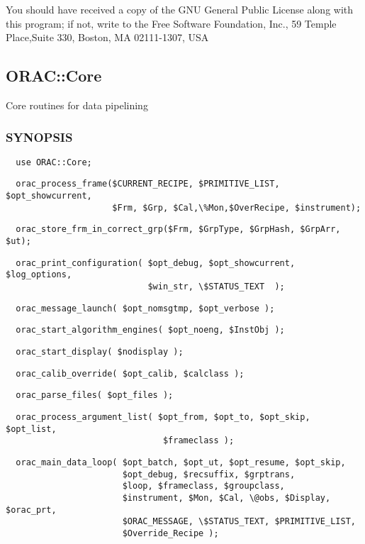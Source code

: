 You should have received a copy of the GNU General Public License along with
this program; if not, write to the Free Software Foundation, Inc., 59 Temple
Place,Suite 330, Boston, MA  02111-1307, USA

\subsection{ORAC::Core\label{ORAC::Core}}


Core routines for data pipelining

\subsubsection*{SYNOPSIS\label{ORAC::Core_SYNOPSIS}}
\begin{verbatim}
  use ORAC::Core;
\end{verbatim}
\begin{verbatim}
  orac_process_frame($CURRENT_RECIPE, $PRIMITIVE_LIST, $opt_showcurrent,
                     $Frm, $Grp, $Cal,\%Mon,$OverRecipe, $instrument);
\end{verbatim}
\begin{verbatim}
  orac_store_frm_in_correct_grp($Frm, $GrpType, $GrpHash, $GrpArr, $ut);
\end{verbatim}
\begin{verbatim}
  orac_print_configuration( $opt_debug, $opt_showcurrent, $log_options,
                            $win_str, \$STATUS_TEXT  );
\end{verbatim}
\begin{verbatim}
  orac_message_launch( $opt_nomsgtmp, $opt_verbose );
\end{verbatim}
\begin{verbatim}
  orac_start_algorithm_engines( $opt_noeng, $InstObj );
\end{verbatim}
\begin{verbatim}
  orac_start_display( $nodisplay );
\end{verbatim}
\begin{verbatim}
  orac_calib_override( $opt_calib, $calclass );
\end{verbatim}
\begin{verbatim}
  orac_parse_files( $opt_files );
\end{verbatim}
\begin{verbatim}
  orac_process_argument_list( $opt_from, $opt_to, $opt_skip, $opt_list,
                               $frameclass );
\end{verbatim}
\begin{verbatim}
  orac_main_data_loop( $opt_batch, $opt_ut, $opt_resume, $opt_skip,
                       $opt_debug, $recsuffix, $grptrans,
                       $loop, $frameclass, $groupclass,
                       $instrument, $Mon, $Cal, \@obs, $Display, $orac_prt,
                       $ORAC_MESSAGE, \$STATUS_TEXT, $PRIMITIVE_LIST,
                       $Override_Recipe );
\end{verbatim}
